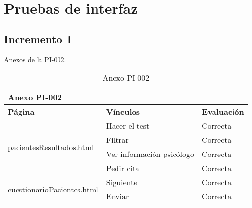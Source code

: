 \section{Pruebas de interfaz}

\subsection{Incremento 1}

Anexos de la PI-002.

\begin{table}[htpb]
\centering
\begin{tabularx}{\textwidth}{|l|X|X|}
\hline
\multicolumn{3}{|l|}{\textbf{Anexo PI-002}}                                                    \\ \hline
\textbf{Página}                             & \textbf{Vínculos}         & \textbf{Evaluación} \\ \hline
\multirow{4}{*}{pacientesResultados.html}   & Hacer el test             & Correcta            \\ \cline{2-3} 
                                            & Filtrar                   & Correcta            \\ \cline{2-3} 
                                            & Ver información psicólogo & Correcta            \\ \cline{2-3} 
                                            & Pedir cita                & Correcta            \\ \hline
\multirow{2}{*}{cuestionarioPacientes.html} & Siguiente                 & Correcta            \\ \cline{2-3} 
                                            & Enviar                    & Correcta            \\ \hline
\end{tabularx}
\caption{Anexo PI-002}
\end{table}



